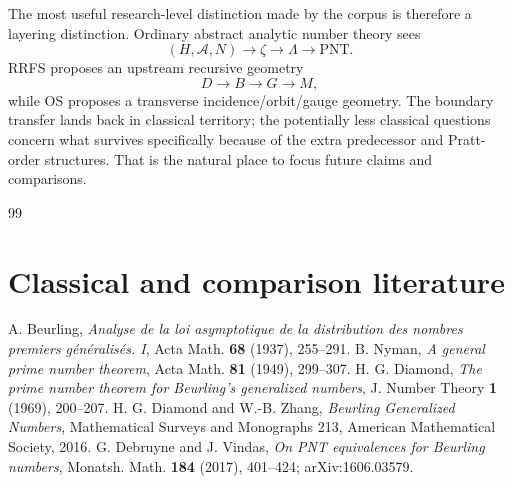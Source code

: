 \documentclass[11pt]{article}
\newcommand{\cA}{\mathcal A}
\begin{document}
The most useful research-level distinction made by the corpus is therefore a layering distinction. Ordinary abstract analytic number theory sees
\[
 (H,\cA,N)\longrightarrow\zeta\longrightarrow\Lambda\longrightarrow\mathrm{PNT}.
\]
RRFS proposes an upstream recursive geometry
\[
 D\longrightarrow B\longrightarrow G\longrightarrow M,
\]
while OS proposes a transverse incidence/orbit/gauge geometry. The boundary transfer lands back in classical territory; the potentially less classical questions concern what survives specifically because of the extra predecessor and Pratt-order structures. That is the natural place to focus future claims and comparisons.

\clearpage
\begin{thebibliography}{99}
\section*{Classical and comparison literature}

 A. Beurling, \emph{Analyse de la loi asymptotique de la distribution des nombres premiers g\'en\'eralis\'es. I}, Acta Math. \textbf{68} (1937), 255--291.
 B. Nyman, \emph{A general prime number theorem}, Acta Math. \textbf{81} (1949), 299--307.
 H. G. Diamond, \emph{The prime number theorem for Beurling's generalized numbers}, J. Number Theory \textbf{1} (1969), 200--207.
 H. G. Diamond and W.-B. Zhang, \emph{Beurling Generalized Numbers}, Mathematical Surveys and Monographs 213, American Mathematical Society, 2016.
 G. Debruyne and J. Vindas, \emph{On PNT equivalences for Beurling numbers}, Monatsh. Math. \textbf{184} (2017), 401--424; arXiv:1606.03579.


\end{thebibliography}
\end{document}
